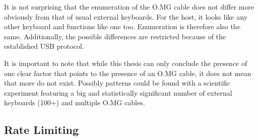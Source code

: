 It is not surprising that the enumeration of the O.MG cable does not differ more obviously from that of usual external keyboards. For the host, it looks like any other keyboard and functions like one too. Enumeration is therefore also the same. Additionally, the possible differences are restricted because of the established USB protocol.

It is important to note that while this thesis can only conclude the presence of one clear factor that points to the presence of an O.MG cable, it does not mean that more do not exist. Possibly patterns could be found with a scientific experiment featuring a big and statistically significant number of external keyboards (100+) and multiple O.MG cables.

\subsection{Rate Limiting}

